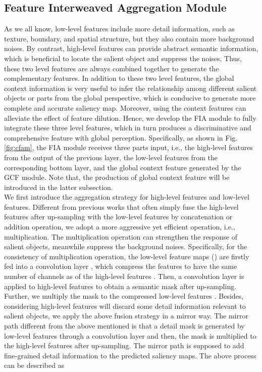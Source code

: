 \documentclass[letterpaper]{article} \usepackage{aaai20}  \usepackage{times}  \usepackage{helvet} \usepackage{courier}  \usepackage[hyphens]{url}  \usepackage{graphicx} \urlstyle{rm} \def\UrlFont{\rm}  \usepackage{graphicx}  \frenchspacing  \setlength{\pdfpagewidth}{8.5in}  \setlength{\pdfpageheight}{11in}
\begin{document}
\subsection{Feature Interweaved Aggregation Module}
As we all know, low-level features include more detail information, such as texture, boundary, and spatial structure, but they also contain more background noises. By contrast, high-level features can provide abstract semantic information, which is beneficial to locate the salient object and suppress the noises. Thus, these two level features are always combined together to generate the complementary features. In addition to these two level features, the global context information is very useful to infer the relationship among different salient objects or parts from the global perspective, which is conducive to generate more complete and accurate saliency map. Moreover, using the context features can alleviate the effect of feature dilution. Hence, we develop the FIA module to fully integrate these three level features, which in turn produces a discriminative and comprehensive feature with global perception. Specifically, as shown in Fig. \ref{fig:cfam}, the FIA module receives three parts input, i.e., the high-level features from the output of the previous layer, the low-level features from the corresponding bottom layer, and the global context feature generated by the GCF module. Note that, the production of global context feature will be introduced in the latter subsection. \\
\indent We first introduce the aggregation strategy for high-level features and low-level features.
Different from previous works \cite{qin2019basnet,liu2019simple} that often simply fuse the high-level features after up-sampling with the low-level features by concatenation or addition operation, 
we adopt a more aggressive yet efficient operation, i.e., multiplication. The multiplication operation can strengthen the response of salient objects, meanwhile suppress the background noises. 
Specifically, for the consistency of multiplication operation, the low-level feature maps  () are firstly fed into 
a  convolution layer , which compress the features to have the same number of channels as of the high-level features .
Then, a  convolution layer is applied to high-level features  to obtain a semantic mask  after up-sampling. Further, we multiply the mask  to the compressed low-level features . Besides, considering high-level features will discard some detail information relevant to salient objects, we apply the above fusion strategy in a mirror way. The mirror path different from the above mentioned is that a detail mask  is generated by low-level features through a  convolution layer and then, the mask  is multiplied to the high-level features  after up-sampling. The mirror path is supposed to add fine-grained detail information to the predicted saliency maps. The above process can be described as 
\end{document}
